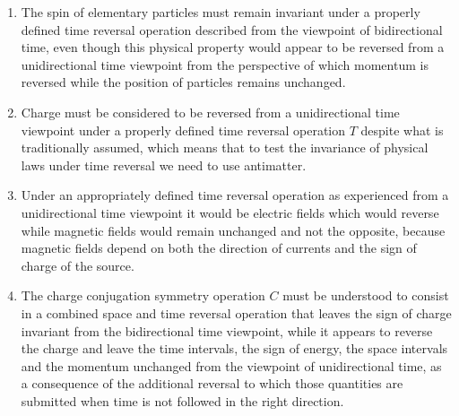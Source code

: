 \documentclass[notitlepage,12pt]{report}
\begin{document}
\begin{enumerate}
\item The spin of elementary particles must remain invariant under a properly defined time reversal operation described from the viewpoint of bidirectional time, even though this physical property would appear to be reversed from a unidirectional time viewpoint from the perspective of which momentum is reversed while the position of particles remains unchanged.

\item Charge must be considered to be reversed from a unidirectional time viewpoint under a properly defined time reversal operation $T$ despite what is traditionally assumed, which means that to test the invariance of physical laws under time reversal we need to use antimatter.

\item Under an appropriately defined time reversal operation as experienced from a unidirectional time viewpoint it would be electric fields which would reverse while magnetic fields would remain unchanged and not the opposite, because magnetic fields depend on both the direction of currents and the sign of charge of the source.

\item The charge conjugation symmetry operation $C$ must be understood to consist in a combined space and time reversal operation that leaves the sign of charge invariant from the bidirectional time viewpoint, while it appears to reverse the charge and leave the time intervals, the sign of energy, the space intervals and the momentum unchanged from the viewpoint of unidirectional time, as a consequence of the additional reversal to which those quantities are submitted when time is not followed in the right direction.


\end{enumerate}
\end{document}
